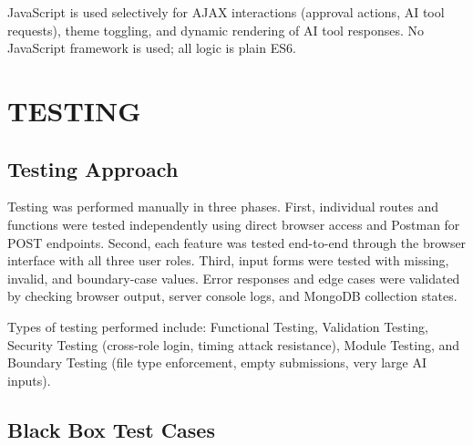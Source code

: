 \documentclass{sgcproject}
\begin{document}
JavaScript is used selectively for AJAX interactions (approval actions, AI tool requests), theme toggling, and dynamic rendering of AI tool responses. No JavaScript framework is used; all logic is plain ES6.

\chapter{TESTING}

\section{Testing Approach}

Testing was performed manually in three phases. First, individual routes and functions were tested independently using direct browser access and Postman for POST endpoints. Second, each feature was tested end-to-end through the browser interface with all three user roles. Third, input forms were tested with missing, invalid, and boundary-case values. Error responses and edge cases were validated by checking browser output, server console logs, and MongoDB collection states.

Types of testing performed include: Functional Testing, Validation Testing, Security Testing (cross-role login, timing attack resistance), Module Testing, and Boundary Testing (file type enforcement, empty submissions, very large AI inputs).

\section{Black Box Test Cases}
\end{document}
